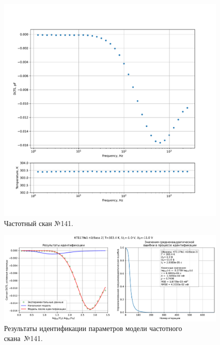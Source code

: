 \begin{figure}[!ht]
    \centering
    \includegraphics[width=1\textwidth]{../plots/КТ117№1_п1(база 2)_2500Гц-1Гц_1пФ_+30С_-1В-11В_200мВ_20мкс_шаг_0,1.pdf}
    \caption{Частотный скан №141.}
    \label{pic:frequency_scan_141}
\end{figure}

\begin{figure}[!ht]
    \centering
    \includegraphics[width=1\textwidth]{../plots/КТ117№1_п1(база 2)_2500Гц-1Гц_1пФ_+30С_-1В-11В_200мВ_20мкс_шаг_0,1_model.pdf}
    \caption{Результаты идентификации параметров модели частотного скана~№141.}
    \label{pic:frequency_scan_model141}
\end{figure}

\pagebreak


